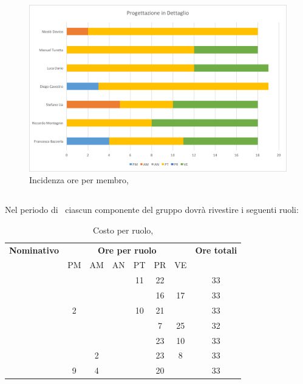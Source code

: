 \begin{figure}[H]
	\centering 
	\includegraphics[scale=0.7]{Immagini/GraficiPianoLavoro/PD.png}
	\caption{Incidenza ore per membro, \PD}
\end{figure}

\newpage
\subsection{\COD}
Nel periodo di \COD\ ciascun componente del gruppo dovrà rivestire i seguenti ruoli:

\begin{table}[h]
	\begin{center}
		\begin{tabular}{|c|c|c|c|c|c|c|c|}
			\hline
			\textbf{Nominativo} & \multicolumn{6}{c|}{\textbf{Ore per ruolo}} & \textbf{Ore totali} \\
					& PM & AM & AN & PT & PR & VE & \\
			\hline
			\FB		&	 &	  &	   & 11	& 22 &	  &	33	\\
			\hline
			\RM		&	 &	  &	   & 	& 16 & 17 & 33	\\
			\hline
			\SL		& 2  &	  &	   & 10	& 21 &    &	33	\\
			\hline
			\DC		&	 &	  &	   &	& 7	 & 25 &	32	\\
			\hline
			\LD 	&	 &	  &	   &	& 23 & 10 &	33	\\
			\hline
			\MT		& 	 & 2  &	   &	& 23 & 8  &	33	\\
			\hline
			\ND 	& 9	 & 4  &	   &	& 20 &    & 33	\\
			\hline
		\end{tabular}
	\end{center}
	\caption{Costo per ruolo, \COD}
\end{table}

